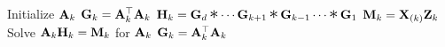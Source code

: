 
\begin{algorithmic}[1]\footnotesize
    
        \State Initialize $\mathbf{A}_k$
        \State $\mathbf{G}_k = \mathbf{A}_k^\top\mathbf{A}_k$ 
      \EndFor
              \State $\mat{H}_k = \mat{G}_d \hada \cdots \mat{G}_{k+1} \hada \mat{G}_{k-1} \cdots \hada \mat{G}_1$  \label{l:NE-Hada}
              \State $\mathbf{M}_k = \mathbf{X}_{(k)}\mathbf{Z}_k$  \label{l:NE-mttkrp}
              \State Solve $\mathbf{A}_k \mathbf{H}_k = \mathbf{M}_{k}$ for $\mathbf{A}_k$  \label{l:NE-solve}
              \State $\mathbf{G}_k = \mathbf{A}_k^\top\mathbf{A}_k$    \label{l:NE-Gram}
          \EndFor
      \EndWhile
    \EndFunction
    
  \end{algorithmic}